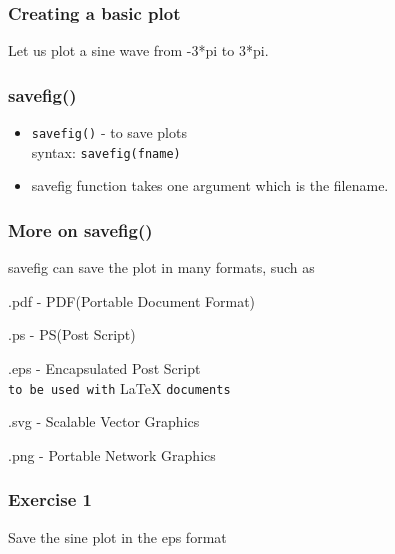 \documentclass[17pt]{beamer}
\begin{document}
\begin{frame}[fragile]
\frametitle{Creating a basic plot}
\label{sec-4}
Let us plot a sine wave from -3*pi to 3*pi.

\end{frame}
\begin{frame}[fragile]
\frametitle{savefig()}
\label{sec-5}
\begin{itemize}
\item \texttt{savefig()} - to save plots\\\pause
syntax: \texttt{savefig(fname)}\pause
\item savefig function takes one argument which is the filename.
\end{itemize} %
\end{frame}
\begin{frame}
\frametitle{More on savefig()}
\label{sec-6}
savefig can save the plot in many formats, such as \pause
\begin{itemize}

\label{sec-6_2}%
\begin{footnotesize}
\item .pdf - PDF(Portable Document Format)\pause\\
\label{sec-6_2_1}%
\item .ps - PS(Post Script)\pause\\
\label{sec-6_2_2}%
\item .eps - Encapsulated Post Script\\
\label{sec-6_2_3}%
\verb~to be used with~ \LaTeX{} \verb~documents~\pause
\item .svg - Scalable Vector Graphics\\
\label{sec-6_2_4}%
\item .png - Portable Network Graphics\\
\end{footnotesize}
\end{itemize} %
\end{frame}
\begin{frame}
\frametitle{Exercise 1}
\label{sec-7}
Save the sine plot in the eps format
\end{frame}
\end{document}
